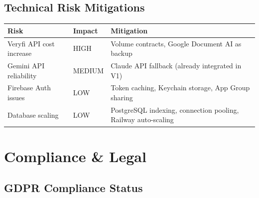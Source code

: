 \documentclass[11pt,a4paper]{report}
\begin{document}
\begin{center}
\end{center}

\section{Technical Risk Mitigations}

\begin{center}
\renewcommand{\arraystretch}{1.4}
\begin{tabular}{>{\raggedright\arraybackslash}p{4cm} >{\centering\arraybackslash}p{2cm} >{\raggedright\arraybackslash}p{7cm}}
\toprule
\rowcolor{miloprimary!15}
\textbf{Risk} & \textbf{Impact} & \textbf{Mitigation} \\
\midrule
Veryfi API cost increase & HIGH & Volume contracts, Google Document AI as backup \\
\rowcolor{lightbg}
Gemini API reliability & MEDIUM & Claude API fallback (already integrated in V1) \\
Firebase Auth issues & LOW & Token caching, Keychain storage, App Group sharing \\
\rowcolor{lightbg}
Database scaling & LOW & PostgreSQL indexing, connection pooling, Railway auto-scaling \\
\bottomrule
\end{tabular}
\end{center}

\chapter{Compliance \& Legal}

\section{GDPR Compliance Status}
\end{document}

